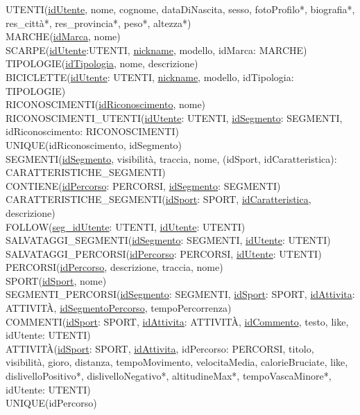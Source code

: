 \documentclass[12pt]{report}
\begin{document}
UTENTI(\underline{idUtente}, nome, cognome, dataDiNascita, sesso, fotoProfilo*, biografia*, res\_città*, res\_provincia*, peso*, altezza*) \\
MARCHE(\underline{idMarca}, nome) \\
SCARPE(\underline{idUtente}:UTENTI, \underline{nickname}, modello, idMarca: MARCHE) \\
TIPOLOGIE(\underline{idTipologia}, nome, descrizione) \\
BICICLETTE(\underline{idUtente}: UTENTI, \underline{nickname}, modello, idTipologia: TIPOLOGIE) \\
RICONOSCIMENTI(\underline{idRiconoscimento}, nome) \\
RICONOSCIMENTI\_UTENTI(\underline{idUtente}: UTENTI, \underline{idSegmento}: SEGMENTI, idRiconoscimento: RICONOSCIMENTI) \\
\hspace*{1cm} UNIQUE(idRiconoscimento, idSegmento) \\
SEGMENTI(\underline{idSegmento}, visibilità, traccia, nome, (idSport, idCaratteristica): CARATTERISTICHE\_SEGMENTI) \\
CONTIENE(\underline{idPercorso}: PERCORSI, \underline{idSegmento}: SEGMENTI) \\
CARATTERISTICHE\_SEGMENTI(\underline{idSport}: SPORT, \underline{idCaratteristica}, descrizione) \\
FOLLOW(\underline{seg\_idUtente}: UTENTI, \underline{idUtente}: UTENTI) \\
SALVATAGGI\_SEGMENTI(\underline{idSegmento}: SEGMENTI, \underline{idUtente}: UTENTI) \\
SALVATAGGI\_PERCORSI(\underline{idPercorso}: PERCORSI, \underline{idUtente}: UTENTI) \\
PERCORSI(\underline{idPercorso}, descrizione, traccia, nome) \\
SPORT(\underline{idSport}, nome) \\
SEGMENTI\_PERCORSI(\underline{idSegmento}: SEGMENTI, \underline{idSport}: SPORT, \underline{idAttivita}: ATTIVITÀ, \underline{idSegmentoPercorso}, tempoPercorrenza) \\
COMMENTI(\underline{idSport}: SPORT, \underline{idAttivita}: ATTIVITÀ, \underline{idCommento}, testo, like, idUtente: UTENTI) \\
ATTIVITÀ(\underline{idSport}: SPORT, \underline{idAttivita}, idPercorso: PERCORSI, titolo, visibilità, gioro, distanza, tempoMovimento, velocitaMedia, calorieBruciate, like, dislivelloPositivo*, dislivelloNegativo*, altitudineMax*, tempoVascaMinore*, idUtente: UTENTI) \\
\hspace*{1cm} UNIQUE(idPercorso)
\end{document}
